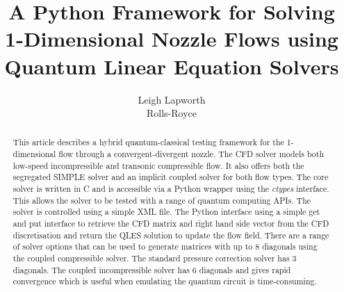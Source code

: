 \documentclass[10pt,a4]{article}
\title{A Python Framework for Solving 1-Dimensional Nozzle Flows using Quantum Linear Equation Solvers}
\author{
  Leigh Lapworth \\
  Rolls-Royce
}
\begin{document}
\maketitle

\begin{abstract}
This article describes a hybrid quantum-classical testing framework for the 1-dimensional
flow through a convergent-divergent nozzle.
The CFD solver models both low-speed incompressible and transonic compressible flow.
It also offers both the segregated SIMPLE solver and an implicit coupled solver for both 
flow types.
The core solver is written in C and is accessible via a Python wrapper using the {\it ctypes}
interface.
This allows the solver to be tested with a range of quantum computing APIs.
The solver is controlled using a simple XML file.
The Python interface using a simple get and put interface to retrieve the CFD matrix and
right hand side vector from the CFD discretisation and return the QLES solution to update the 
flow field.
There are a range of solver options that can be used to generate matrices with up to 8 diagonals 
using the coupled compressible solver. The standard pressure correction solver has 3 diagonals.
The coupled incompressible solver has 6 diagonals and gives rapid convergence which is useful when
emulating the quantum circuit is time-consuming.
\end{abstract}


\printnomenclature

\newpage
\tableofcontents

\newpage









\end{document}
